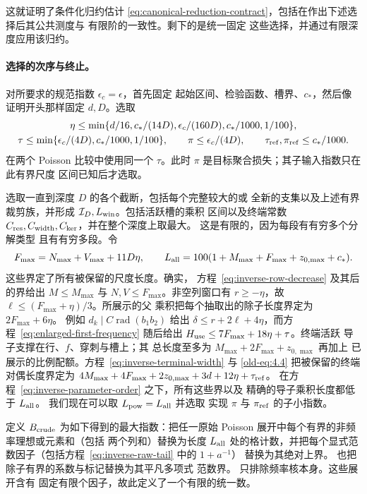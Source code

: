 这就证明了条件化归约估计
\eqref{eq:canonical-reduction-contract}，包括在作出下述选择后其公共测度与
有限阶的一致性。剩下的是统一固定
这些选择，并通过有限深度应用该归约。

\paragraph{选择的次序与终止。}
对所要求的规范指数 \(\epsilon_c=\epsilon\)，首先固定
起始区间、检验函数、槽界、\(c_*\)，然后像证明开头那样固定 \(d,D\)。选取
\begin{equation}\label{eq:inverse-parameter-order}
 \begin{gathered}
 \eta\le\min\{d/16,c_*/(14D),\epsilon_c/(160D),c_*/1000,1/100\},\\
 \tau\le\min\{\epsilon_c/(4D),c_*/1000,1/100\},\qquad
 \pi\le\epsilon_c/(4D),\qquad
 \tau_{\rm ref},\pi_{\rm ref}\le c_*/1000.
 \end{gathered}
\end{equation}
在两个 Poisson 比较中使用同一个 \(\tau\)。此时 \(\pi\)
是目标聚合损失；其子输入指数只在此有界尺度
区间已知后才选取。

选取一直到深度 \(D\) 的各个截断，包括每个完整较大的或
全新的支集以及上述有界裁剪族，并形成
\(\mathcal I_D,L_{\rm win}\)。包括活跃槽的乘积
区间以及终端常数
\(C_{\rm res},C_{\rm width},C_{\rm ker}\)，并在整个深度上取最大。
这是有限的，因为每段有有穷多个分解类型
且有有穷多段。令
\[
 F_{\max}=N_{\max}+V_{\max}+11D\eta,\qquad
 L_{\rm all}=100(1+M_{\max}+F_{\max}+z_{0,\max}+c_*).
\]
这些界定了所有被保留的尺度长度。确实，
方程~\eqref{eq:inverse-row-decrease} 及其后的界给出
\(M\le M_{\max}\) 与 \(N,V\le F_{\max}\)。非空列窗口有
\(r\ge-\eta\)，故 \(\ell\le(F_{\max}+\eta)/3\)。所展示的父
乘积把每个抽取出的除子长度界定为 \(2F_{\max}+6\eta\)。
例如 \(d_k\mid C\operatorname{rad}(b_1b_2)\) 给出
\(\delta\le r+2\ell+4\eta\)，而方程~\eqref{eq:enlarged-first-frequency}
随后给出 \(H_{\rm use}\le7F_{\max}+18\eta+\tau\)。终端活跃
导子支撑在行、\(f\)、穿刺与槽上；其
总长度至多为 \(M_{\max}+2F_{\max}+z_{0,\max}\) 再加上
已展示的比例配额。方程~\eqref{eq:inverse-terminal-width}
与 \eqref{old-eq:4.4} 把被保留的终端对偶长度界定为
\(4M_{\max}+4F_{\max}+2z_{0,\max}+3d+12\eta+\tau_{\rm ref}\)。
在方程~\eqref{eq:inverse-parameter-order} 之下，所有这些界以及
精确的导子乘积长度都低于 \(L_{\rm all}\)。
我们现在可以取 \(L_{\rm pow}=L_{\rm all}\) 并选取
实现 \(\pi\) 与 \(\pi_{\rm ref}\) 的子小指数。

定义 \(B_{\rm crude}\) 为如下得到的最大指数：把任一原始 Poisson
展开中每个有界的非频率理想或元素和（包括
两个列和）替换为长度
\(L_{\rm all}\) 处的格计数，并把每个显式范数因子（包括方程~\eqref{eq:inverse-raw-tail} 中的 \(1+a^{-1}\)）
替换为其绝对上界。
也把除子有界的系数与标记替换为其平凡多项式
范数界。
只排除频率核本身。这些展开含有
固定有限个因子，故此定义了一个有限的统一数。

